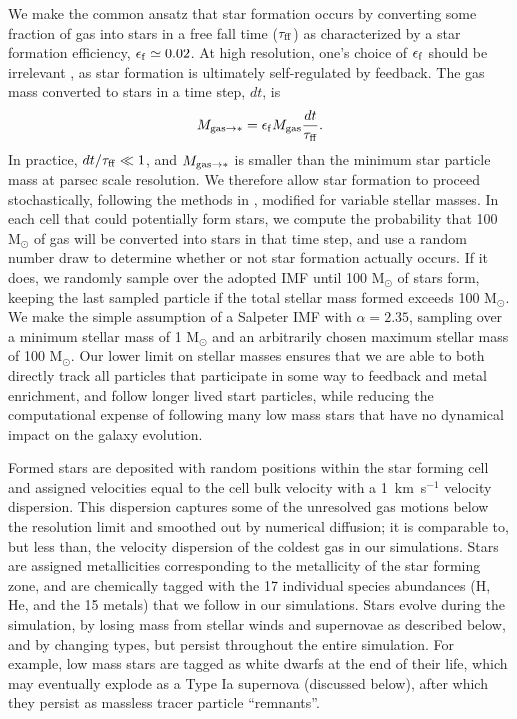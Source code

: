\documentclass[twocolumn]{aastex61}
\begin{document}
We make the common ansatz that star formation occurs by converting some fraction of gas into stars in a free fall time ($\tau_{\rm ff}$) as characterized by a star formation efficiency, $\epsilon_{\rm f} \simeq 0.02$. At high resolution, one's choice of $\epsilon_{\rm f}$ should be irrelevant \citep{Orr2017, FIRE2}, as star formation is ultimately self-regulated by feedback.
The gas mass converted to stars in a time step, $dt$, is
\begin{equation}
M_{ {\rm gas} \to *} = \epsilon_{\rm f} M_{\rm gas} \frac{dt}{\tau_{\rm ff}}.
\end{equation}
In practice, $dt/\tau_{\rm ff} \ll 1$, and $M_{ {\rm gas} \to *}$ is smaller than the minimum star particle mass at parsec scale resolution. We therefore allow star formation to proceed stochastically, following the methods in \citet{Goldbaum2015, Goldbaum2016}, modified for variable stellar masses. In each cell that could potentially form stars, we compute the probability that 100 M$_{\odot}$ of gas will be converted into stars in that time step, and use a random number draw to determine whether or not star formation actually occurs. If it does, we randomly sample over the adopted IMF until 100 M$_{\odot}$ of stars form, keeping the last sampled particle if the total stellar mass formed exceeds 100 M$_{\odot}$. We make the simple assumption of a Salpeter IMF \citep{Salpeter1955} with $\alpha = 2.35$, sampling over a minimum stellar mass of 1 M$_{\odot}$ and an arbitrarily chosen maximum stellar mass of 100 M$_{\odot}$. Our lower limit on stellar masses ensures that we are able to both directly track all particles that participate in some way to feedback and metal enrichment, and follow longer lived start particles, while reducing the computational expense of following many low mass stars that have no dynamical impact on the galaxy evolution.

Formed stars are deposited with random positions within the star forming cell and assigned velocities equal to the cell bulk velocity with a 1~km~s$^{-1}$ velocity dispersion. This dispersion captures some of the unresolved gas motions below the resolution limit and smoothed out by numerical diffusion; it is comparable to, but less than, the velocity dispersion of the coldest gas in our simulations. Stars are assigned metallicities corresponding to the metallicity of the star forming zone, and are chemically tagged with the 17 individual species abundances (H, He, and the 15 metals) that we follow in our simulations. Stars evolve during the simulation, by losing mass from stellar winds and supernovae as described below, and by changing types, but persist throughout the entire simulation. For example, low mass stars are tagged as white dwarfs at the end of their life, which may eventually explode as a Type Ia supernova (discussed below), after which they persist as massless tracer particle ``remnants''. 
\end{document}
